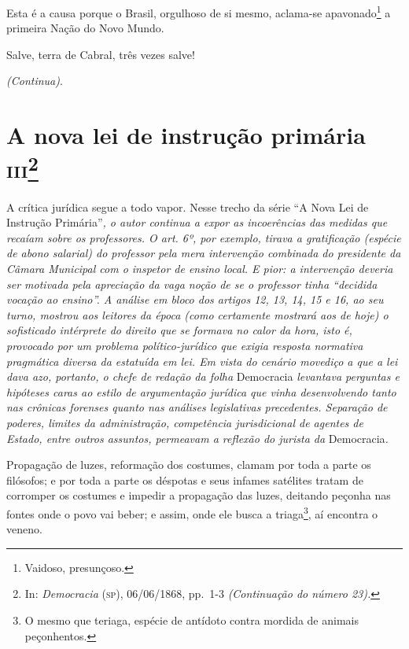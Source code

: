 Esta é a causa porque o Brasil, orgulhoso de si mesmo, aclama-se
apavonado\footnote{Vaidoso, presunçoso.} a primeira Nação do Novo
Mundo.

Salve, terra de Cabral, três vezes salve!

\emph{(Continua)}.

\chapter{A nova lei de instrução primária \textsc{iii}\footnote{In:
  \emph{Democracia} (\textsc{sp}), 06/06/1868, pp.~1-3 \emph{(Continuação do
  número 23).}}}

\begin{didascalia}
A crítica jurídica segue a todo vapor. Nesse trecho da série ``A Nova
Lei de Instrução Primária''\emph{, o autor continua a expor as
incoerências das medidas que recaíam sobre os professores. O art. 6º,
por exemplo, tirava a gratificação (espécie de abono salarial) do
professor pela mera intervenção combinada do presidente da Câmara
Municipal com o inspetor de ensino local. E pior: a intervenção deveria
ser motivada pela apreciação da vaga noção de se o professor tinha
``decidida vocação ao ensino''. A análise em bloco dos artigos 12, 13, 14,
15 e 16, ao seu turno, mostrou aos leitores da época (como certamente
mostrará aos de hoje) o sofisticado intérprete do direito que se formava
no calor da hora, isto é, provocado por um problema político-jurídico
que exigia resposta normativa pragmática diversa da estatuída em lei. Em
vista do cenário movediço a que a lei dava azo, portanto, o chefe de
redação da folha} Democracia \emph{levantava perguntas e hipóteses caras
ao estilo de argumentação jurídica que vinha desenvolvendo tanto nas
crônicas forenses quanto nas análises legislativas precedentes.
Separação de poderes, limites da administração, competência
jurisdicional de agentes de Estado, entre outros assuntos, permeavam a
reflexão do jurista da} Democracia\emph{.}
\end{didascalia}



Propagação de luzes, reformação dos costumes, clamam por toda a parte os
filósofos; e por toda a parte os déspotas e seus infames satélites
tratam de corromper os costumes e impedir a propagação das luzes,
deitando peçonha nas fontes onde o povo vai beber; e assim, onde ele
busca a triaga\footnote{O mesmo que teriaga, espécie de antídoto
  contra mordida de animais peçonhentos.}, aí encontra o veneno.

